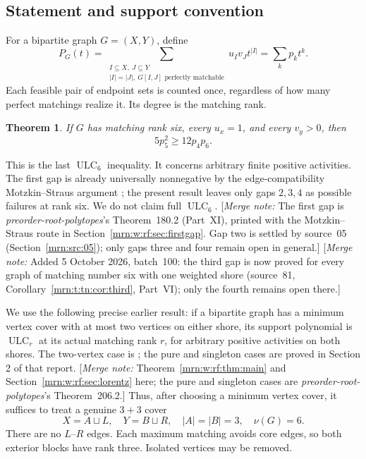 \documentclass[11pt,a4paper]{article}
\newtheorem{theorem}{Theorem}[section]
\theoremstyle{remark}\newtheorem{remark}[theorem]{Remark}
\newcommand{\ULC}{\operatorname{ULC}}      %
\newcommand{\mnote}[1]{[\textit{Merge note:} #1]}
\newcommand{\prp}{\emph{preorder-root-polytopes}}
\begin{document}
\subsection{Statement and support convention}
For a bipartite graph $G=(X,Y)$, define
\[
 P_G(t)=\sum_{\substack{I\subseteq X,\ J\subseteq Y\\
 |I|=|J|,\ G[I,J]\text{ perfectly matchable}}}u_Iv_Jt^{|I|}
       =\sum_kp_kt^k.
\]
Each feasible pair of endpoint sets is counted once, regardless of how many perfect matchings realize it. Its degree is the matching rank.

\begin{theorem}\label{mrn:s:lg:thm:main}
If $G$ has matching rank six, every $u_x=1$, and every $v_y>0$, then
\begin{equation}\label{mrn:s:lg:eq:last}
 5p_5^2\ge12p_4p_6.
\end{equation}
\end{theorem}
This is the last $\ULC_6$ inequality. It concerns arbitrary finite positive activities. The first gap is already universally nonnegative by the edge-compatibility Motzkin--Straus argument \cite{b:MS}; the present result leaves only gaps $2,3,4$ as possible failures at rank six. We do not claim full $\ULC_6$. \mnote{The first gap is \prp's Theorem~180.2 (Part~XI), printed with the Motzkin--Straus route in Section~\ref{mrn:w:rf:sec:firstgap}. Gap two is settled by source~05 (Section~\ref{mrn:src:05}); only gaps three and four remain open in general.} \mnote{Added 5 October 2026, batch~100: the third gap is now proved for every graph of matching number six with one weighted shore (source~81, Corollary~\ref{mrn:t:tn:cor:third}, Part~VI); only the fourth remains open there.}

We use the following precise earlier result: if a bipartite graph has a minimum vertex cover with at most two vertices on either shore, its support polynomial is $\ULC_r$ at its actual matching rank $r$, for arbitrary positive activities on both shores. The two-vertex case is \cite[Theorem 1.1]{b:m74}; the pure and singleton cases are proved in Section 2 of that report. \mnote{Theorem~\ref{mrn:w:rf:thm:main} and Section~\ref{mrn:w:rf:sec:lorentz} here; the pure and singleton cases are \prp's Theorem~206.2.} Thus, after choosing a minimum vertex cover, it suffices to treat a genuine $3+3$ cover
\[
 X=A\sqcup L,\quad Y=B\sqcup R,\quad |A|=|B|=3,\quad \nu(G)=6.
\]
There are no $L$--$R$ edges. Each maximum matching avoids core edges, so both exterior blocks have rank three. Isolated vertices may be removed.
\end{document}
